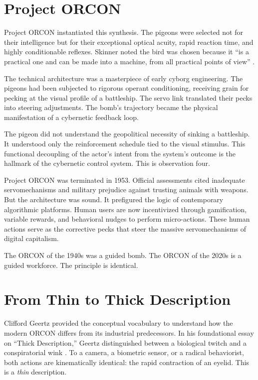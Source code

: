 \documentclass[runningheads]{llncs}
\begin{document}
\section{Project ORCON}

Project ORCON instantiated this synthesis. The pigeons were selected not for their intelligence but for their exceptional optical acuity, rapid reaction time, and highly conditionable reflexes. Skinner noted the bird was chosen because it ``is a practical one and can be made into a machine, from all practical points of view'' \cite{skinner1960pigeons}.

The technical architecture was a masterpiece of early cyborg engineering. The pigeons had been subjected to rigorous operant conditioning, receiving grain for pecking at the visual profile of a battleship. The servo link translated their pecks into steering adjustments. The bomb's trajectory became the physical manifestation of a cybernetic feedback loop.

The pigeon did not understand the geopolitical necessity of sinking a battleship. It understood only the reinforcement schedule tied to the visual stimulus. This functional decoupling of the actor's intent from the system's outcome is the hallmark of the cybernetic control system. This is observation four.

Project ORCON was terminated in 1953. Official assessments cited inadequate servomechanisms and military prejudice against trusting animals with weapons. But the architecture was sound. It prefigured the logic of contemporary algorithmic platforms. Human users are now incentivized through gamification, variable rewards, and behavioral nudges to perform micro-actions. These human actions serve as the corrective pecks that steer the massive servomechanisms of digital capitalism.

The ORCON of the 1940s was a guided bomb. The ORCON of the 2020s is a guided workforce. The principle is identical.

\section{From Thin to Thick Description}

Clifford Geertz provided the conceptual vocabulary to understand how the modern ORCON differs from its industrial predecessors. In his foundational essay on ``Thick Description,'' Geertz distinguished between a biological twitch and a conspiratorial wink \cite{geertz1973interpretation}. To a camera, a biometric sensor, or a radical behaviorist, both actions are kinematically identical: the rapid contraction of an eyelid. This is a \textit{thin} description.
\end{document}
